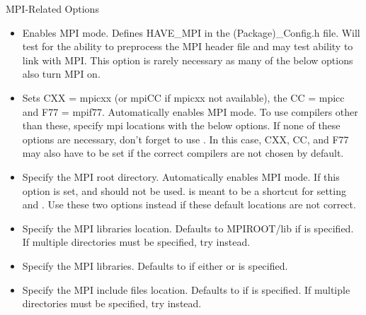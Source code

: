 \documentclass[12pt,strict]{TrilinosDevGuide}
\begin{document}
MPI-Related Options

\begin{itemize}
\item {}

Enables MPI mode. Defines HAVE\_MPI in the (Package)\_Config.h file. Will test 
for the ability to preprocess the MPI header file and may test ability to link 
with MPI.  This option is rarely necessary as many of the below options also 
turn MPI on.  

\item {}

Sets CXX = mpicxx (or mpiCC if mpicxx not available), the CC = mpicc and 
F77 = mpif77.  Automatically enables MPI mode.  To use compilers other than 
these, specify mpi locations with the below options.  If none of these options 
are necessary, don't forget to use .  In this 
case, CXX, CC, and F77 may also have to be set if the correct compilers are 
not chosen by default.

\item {}

Specify the MPI root directory. Automatically enables MPI mode.  If this 
option is set,  and 
 should not be used.  
 is meant to be a shortcut for setting \newline
{} 
and .  Use these two options instead if 
these default locations are not correct.

\item {}

Specify the MPI libraries location. Defaults to MPIROOT/lib if 
 is specified. If multiple directories must be 
specified, try \newline
{} instead. 

\item {} 

Specify the MPI libraries. Defaults to 
 if either or 
 is specified.

\item {}

Specify the MPI include files location. Defaults to  if 
 is specified. If multiple directories  must be specified, try 
\newline
{} instead.
\end{itemize}
\end{document}
